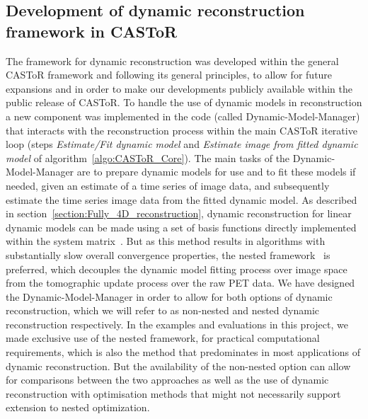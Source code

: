 \subsection{Development of dynamic reconstruction framework in CASToR}
The framework for dynamic reconstruction was developed within the general CASToR framework and following its general principles, to allow for future expansions and in order to make our developments publicly available within the public release of CASToR.
To handle the use of dynamic models in reconstruction a new component was implemented in the code (called Dynamic-Model-Manager) that interacts with the reconstruction process within the main CASToR iterative loop (steps \textit{Estimate/Fit dynamic model} and \textit{Estimate image from fitted dynamic model} of algorithm~\ref{algo:CASToR_Core}). 
The main tasks of the Dynamic-Model-Manager are to prepare dynamic models for use and to fit these models if needed, given an estimate of a time series of image data, and subsequently estimate the time series image data from the fitted dynamic model. 
As described in section~\ref{section:Fully_4D_reconstruction}, dynamic reconstruction for linear dynamic models can be made using a set of basis functions directly implemented within the system matrix~\cite{Matthews1995,Wang2008,Reader2014}. But as this method results in algorithms with substantially slow overall convergence properties, the nested framework~\cite{Wang2010,Matthews2010} is preferred, which decouples the dynamic model fitting process over image space from the tomographic update process over the raw PET data.
We have designed the Dynamic-Model-Manager in order to allow for both options of dynamic reconstruction, which we will refer to as non-nested and nested dynamic reconstruction respectively.
In the examples and evaluations in this project, we made exclusive use of the nested framework, for practical computational requirements, which is also the method that predominates in most applications of dynamic reconstruction. But the availability of the non-nested option can allow for comparisons between the two approaches as well as the use of dynamic reconstruction with optimisation methods that might not necessarily support extension to nested optimization.

